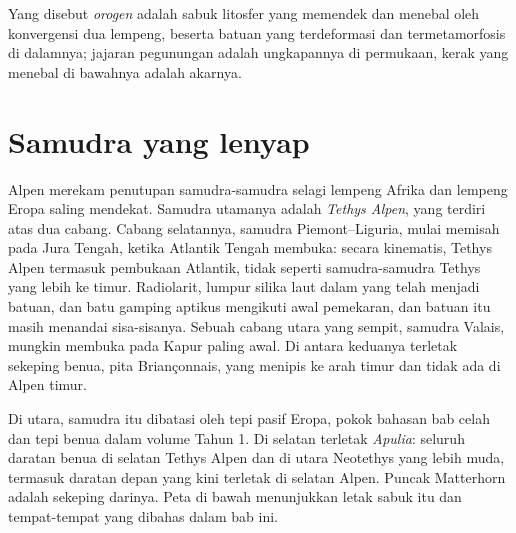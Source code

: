 \begin{definition}[Orogen]\label{def:b2:alpine-orogen:orogen}
Yang disebut \emph{orogen} adalah sabuk litosfer yang memendek dan menebal oleh
konvergensi dua lempeng, beserta batuan yang terdeformasi dan termetamorfosis di dalamnya;
jajaran pegunungan adalah ungkapannya di permukaan, kerak yang menebal di bawahnya adalah akarnya.
\end{definition}

\section{Samudra yang lenyap}\label{sec:b2:alpine-orogen:tethys}

Alpen merekam penutupan samudra-samudra selagi lempeng Afrika dan lempeng Eropa saling mendekat.
Samudra utamanya adalah \emph{Tethys Alpen}, yang terdiri atas dua cabang. Cabang selatannya, samudra
Piemont--Liguria, mulai memisah pada Jura Tengah, ketika Atlantik Tengah
membuka: secara kinematis, Tethys Alpen termasuk pembukaan Atlantik, tidak seperti
samudra-samudra Tethys yang lebih ke timur. Radiolarit, lumpur silika laut dalam yang telah menjadi batuan,
dan batu gamping aptikus mengikuti awal pemekaran, dan batuan itu masih menandai
sisa-sisanya. Sebuah cabang utara yang sempit, samudra Valais, mungkin membuka pada
Kapur paling awal. Di antara keduanya terletak sekeping benua, pita Briançonnais, yang menipis
ke arah timur dan tidak ada di Alpen timur.

Di utara, samudra itu dibatasi oleh tepi pasif Eropa, pokok bahasan bab celah dan
tepi benua dalam volume Tahun 1. Di selatan terletak \emph{Apulia}: seluruh daratan
benua di selatan Tethys Alpen dan di utara Neotethys yang lebih muda, termasuk daratan depan
yang kini terletak di selatan Alpen. Puncak Matterhorn adalah sekeping darinya.
Peta di bawah menunjukkan letak sabuk itu dan tempat-tempat yang dibahas dalam bab ini.

